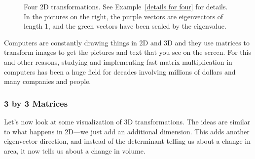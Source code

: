 \begin{example}
\begin{figure}
\begin{tikzpicture}
\end{tikzpicture}
\caption{Four 2D transformations. See Example~\ref{details for four} for details. In the pictures on the right, the purple vectors are eigenvectors of length 1, and the green vectors have been scaled by the eigenvalue.
}
\label{four matrix transformations}
\end{figure}
\end{example}

Computers are constantly drawing things in 2D and 3D and they use matrices to transform images to get the pictures and text that you see on the screen.  For this and other reasons, studying and implementing fast matrix multiplication in computers has been a huge field for decades involving millions of dollars and many companies and people.



\subsubsection{3 by 3 Matrices}

Let's now look at some visualization of 3D transformations. The ideas are similar to what happens in 2D---we just add an additional dimension. This adds another eigenvector direction, and instead of the determinant telling us about a change in area, it now tells us about a change in volume.

